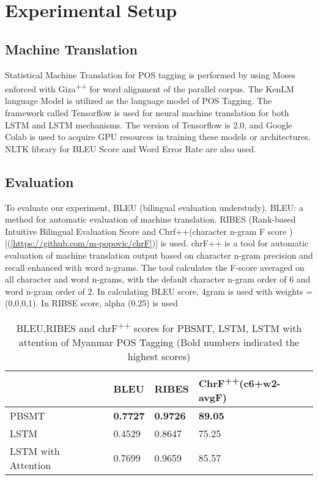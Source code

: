 \documentclass[conference]{IEEEtran}
\begin{document}
\section{Experimental Setup}\label{sec:ExperimentalSetup}
\subsection {Machine Translation}
Statistical Machine Translation for POS tagging is performed by using Moses\cite{b7} enforced with Giza\textsuperscript{++}\cite{b8} for word alignment of the parallel corpus. The KenLM language Model is utilized as the language model of POS Tagging. The framework called Tensorflow is used for neural machine translation for both LSTM and LSTM mechanisms. The version of Tensorflow is 2.0, and Google Colab is used to acquire GPU resources in training these models or architectures. NLTK library for BLEU Score and Word Error Rate are also used.

\subsection{Evaluation}
To evaluate our experiment, BLEU (bilingual evaluation understudy)\cite{b9}. BLEU: a method for automatic evaluation of machine translation.
RIBES (Rank-based Intuitive Bilingual Evaluation Score \cite{b10} and Chrf++(character n-gram F score ) [(\href{[https://github.com/m-popovic/chrF]}{[https://github.com/m-popovic/chrF]})] is used.
chrF++ is a tool for automatic evaluation of machine translation output based on character n-gram precision and recall enhanced with word n-grams. The tool calculates the F-score averaged on all character and word n-grams, with the default character n-gram order of 6 and word n-gram order of 2.
In calculating BLEU score, 4gram is used with weights = (0,0,0,1).
In RIBSE score, alpha (0.25) is used

\begin{table*}
\caption{\label{table:one} BLEU,RIBES and chrF\textsuperscript{++} scores for PBSMT, LSTM, LSTM with attention of Myanmar POS Tagging (Bold numbers indicated the highest scores)}
\begin{center}
\begin{tabular}{ | l | l | l | p{5cm} |}
    \hline
     &  \textbf{BLEU} & \textbf{RIBES} & \textbf{ChrF\textsuperscript{++}(c6+w2-avgF)} \\ \hline
    PBSMT & \textbf{0.7727} & \textbf{0.9726} & \textbf{89.05} \\ \hline
    LSTM & 0.4529 & 0.8647 & 75.25 \\ \hline
    LSTM with Attention & 0.7699  & 0.9659 & 85.57 \\ \hline
\end{tabular}
\end{center}
\end{table*}
\end{document}
